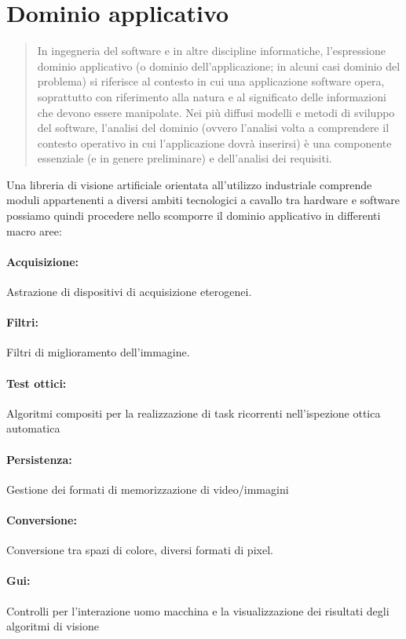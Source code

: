 \section{Dominio applicativo}
\label{sec:dominio-applicativo}

\begin{quote}
\small
In ingegneria del software e in altre discipline informatiche, l'espressione dominio applicativo (o dominio dell'applicazione; in alcuni casi dominio del problema) si riferisce al contesto in cui una applicazione software opera, soprattutto con riferimento alla natura e al significato delle informazioni che devono essere manipolate. Nei più diffusi modelli e metodi di sviluppo del software, l'analisi del dominio (ovvero l'analisi volta a comprendere il contesto operativo in cui l'applicazione dovrà inserirsi) è una componente essenziale (e in genere preliminare) e dell'analisi dei requisiti.
\end{quote}
Una libreria di visione artificiale orientata all'utilizzo industriale comprende moduli appartenenti a diversi ambiti tecnologici a cavallo tra hardware e software possiamo quindi procedere nello scomporre il dominio applicativo in differenti macro aree:

\paragraph{Acquisizione:}
Astrazione di dispositivi di acquisizione eterogenei.
\paragraph{Filtri:}
Filtri di miglioramento dell'immagine.
\paragraph{Test ottici:}
Algoritmi compositi per la realizzazione di task ricorrenti nell'ispezione ottica automatica
\paragraph{Persistenza:}
Gestione dei formati di memorizzazione di video/immagini
\paragraph{Conversione:}
Conversione tra spazi di colore, diversi formati di pixel.
\paragraph{Gui:}
Controlli per l'interazione uomo macchina e la visualizzazione dei risultati degli algoritmi di visione



